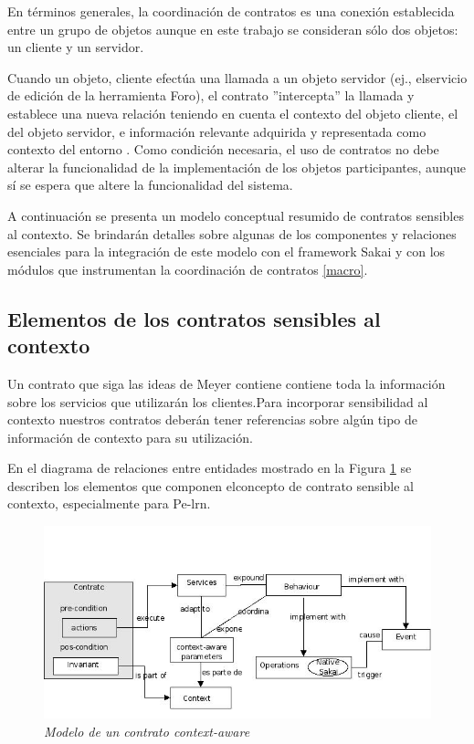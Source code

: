 En términos generales, la coordinación de contratos es una conexión
establecida entre un grupo de objetos aunque en este trabajo se consideran sólo
dos objetos: un cliente y un servidor.



Cuando un objeto, cliente efectúa una llamada a un objeto servidor (ej.,
elservicio de edición de la herramienta Foro), el contrato ''intercepta'' la 
llamada y establece una nueva relación teniendo en cuenta el contexto del objeto
cliente, el del objeto servidor, e información relevante adquirida y
representada como contexto del entorno \cite{contexto}. Como condición
necesaria, el uso de  contratos no debe alterar la funcionalidad de     
la implementación de los objetos participantes, aunque sí se espera que altere
la funcionalidad del sistema.

A continuación se presenta un modelo conceptual resumido de contratos sensibles
al contexto. Se brindarán detalles sobre algunas de los componentes y relaciones
esenciales para la integración de este modelo con el framework Sakai y con los
módulos que instrumentan la coordinación de contratos \ref{macro}.

\subsection {Elementos de los contratos sensibles al contexto}


Un contrato que siga las ideas de Meyer contiene contiene toda la información
sobre los servicios que utilizarán los clientes.Para incorporar sensibilidad al
contexto nuestros contratos deberán tener referencias sobre algún tipo de
información de contexto para su utilización.

En el diagrama de relaciones entre entidades mostrado en la Figura
\ref{contratoca} se describen los elementos que componen elconcepto de contrato
sensible al contexto, especialmente para Pe-lrn.

\begin{figure}[!ht]
\begin{center}
	\includegraphics[width=5 in,totalheight=2.8 in]{Ch5/f1}
	\caption{\small \sl Modelo de un contrato context-aware} \label{contratoca}
\end{center}
         \end{figure}

